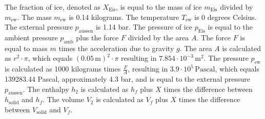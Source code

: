 The fraction of ice, denoted as \( X_{\text{Eis}} \), is equal to the mass of ice \( m_{\text{Eis}} \) divided by \( m_{\text{ew}} \).
The mass \( m_{\text{ew}} \) is 0.14 kilograms.
The temperature \( T_{\text{ew}} \) is 0 degrees Celsius.
The external pressure \( p_{\text{aussen}} \) is 1.14 bar.
The pressure of ice \( p_{\text{Eis}} \) is equal to the ambient pressure \( p_{\text{amb}} \) plus the force \( F \) divided by the area \( A \).
The force \( F \) is equal to mass \( m \) times the acceleration due to gravity \( g \).
The area \( A \) is calculated as \( r^2 \cdot \pi \), which equals \( (0.05 \, \text{m})^2 \cdot \pi \) resulting in \( 7.854 \cdot 10^{-3} \, \text{m}^2 \).
The pressure \( p_{\text{ew}} \) is calculated as 1000 kilograms times \( \frac{F}{A} \), resulting in \( 3.9 \cdot 10^5 \, \text{Pascal} \), which equals 139283.44 Pascal, approximately 4.3 bar, and is equal to the external pressure \( p_{\text{aussen}} \).
The enthalpy \( h_2 \) is calculated as \( h_f \) plus \( X \) times the difference between \( h_{\text{solid}} \) and \( h_f \).
The volume \( V_2 \) is calculated as \( V_f \) plus \( X \) times the difference between \( V_{\text{solid}} \) and \( V_f \).